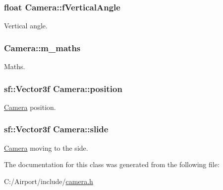 \subsubsection[{\texorpdfstring{f\+Vertical\+Angle}{fVerticalAngle}}]{\setlength{\rightskip}{0pt plus 5cm}float Camera\+::f\+Vertical\+Angle\hspace{0.3cm}{\ttfamily [private]}}\hypertarget{class_camera_ada1359a4c866f93aa97fb663db45bb69}{}\label{class_camera_ada1359a4c866f93aa97fb663db45bb69}
Vertical angle. 
\subsubsection[{\texorpdfstring{m\+\_\+maths}{m_maths}}]{ Camera\+::m\+\_\+maths\hspace{0.3cm}{\ttfamily [private]}}\hypertarget{class_camera_a12c980cdff20aedc0f6ac08b985757aa}{}\label{class_camera_a12c980cdff20aedc0f6ac08b985757aa}
Maths. 
\subsubsection[{\texorpdfstring{position}{position}}]{\setlength{\rightskip}{0pt plus 5cm}sf\+::\+Vector3f Camera\+::position\hspace{0.3cm}{\ttfamily [private]}}\hypertarget{class_camera_a7a74f182c7bf64bb7e3238a38a251156}{}\label{class_camera_a7a74f182c7bf64bb7e3238a38a251156}
\hyperlink{class_camera}{Camera} position. 
\subsubsection[{\texorpdfstring{slide}{slide}}]{\setlength{\rightskip}{0pt plus 5cm}sf\+::\+Vector3f Camera\+::slide\hspace{0.3cm}{\ttfamily [private]}}\hypertarget{class_camera_a0ecb048ae43024cfda52267918e6c87e}{}\label{class_camera_a0ecb048ae43024cfda52267918e6c87e}
\hyperlink{class_camera}{Camera} moving to the side. 

The documentation for this class was generated from the following file\+:\begin{DoxyCompactItemize}
\item 
C\+:/\+Airport/include/\hyperlink{camera_8h}{camera.\+h}\end{DoxyCompactItemize}
